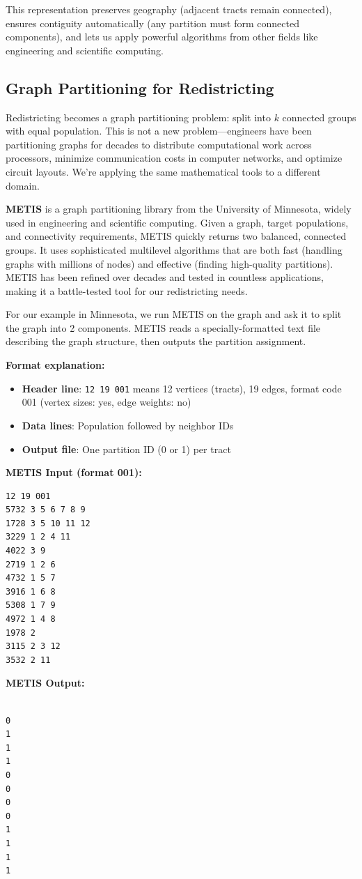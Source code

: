 \documentclass[11pt]{article}
\begin{document}
This representation preserves geography (adjacent tracts remain connected), ensures contiguity automatically (any partition must form connected components), and lets us apply powerful algorithms from other fields like engineering and scientific computing. 

\subsection{Graph Partitioning for Redistricting}

Redistricting becomes a graph partitioning problem: split into $k$ connected groups with equal population. This is not a new problem—engineers have been partitioning graphs for decades to distribute computational work across processors, minimize communication costs in computer networks, and optimize circuit layouts. We're applying the same mathematical tools to a different domain.

\textbf{METIS} is a graph partitioning library from the University of Minnesota, widely used in engineering and scientific computing. Given a graph, target populations, and connectivity requirements, METIS quickly returns two balanced, connected groups. It uses sophisticated multilevel algorithms that are both fast (handling graphs with millions of nodes) and effective (finding high-quality partitions). METIS has been refined over decades and tested in countless applications, making it a battle-tested tool for our redistricting needs.

For our example in Minnesota, we run METIS on the graph and ask it to split the graph into 2 components. METIS reads a specially-formatted text file describing the graph structure, then outputs the partition assignment.

\textbf{Format explanation:}
\begin{itemize}[noitemsep,topsep=0pt]
\item \textbf{Header line}: \texttt{12 19 001} means 12 vertices (tracts), 19 edges, format code 001 (vertex sizes: yes, edge weights: no)
\item \textbf{Data lines}: Population followed by neighbor IDs
\item \textbf{Output file}: One partition ID (0 or 1) per tract
\end{itemize}

\vspace{0.5em}
\noindent
\begin{minipage}[t]{0.48\textwidth}
\textbf{METIS Input (format 001):}
{\scriptsize
\begin{verbatim}
12 19 001
5732 3 5 6 7 8 9
1728 3 5 10 11 12
3229 1 2 4 11
4022 3 9
2719 1 2 6
4732 1 5 7
3916 1 6 8
5308 1 7 9
4972 1 4 8
1978 2
3115 2 3 12
3532 2 11
\end{verbatim}
}
\end{minipage}%
\hfill
\begin{minipage}[t]{0.48\textwidth}
\textbf{METIS Output:}
{\scriptsize
\begin{verbatim}

0
1
1
1
0
0
0
0
1
1
1
1
\end{verbatim}
}
\end{minipage}
\end{document}
